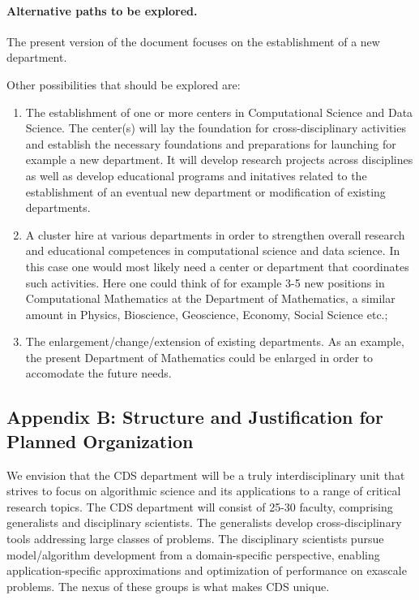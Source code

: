 \documentclass[%
oneside,                 %
final,                   %
10pt]{article}
\begin{document}
\noindent
\paragraph{Alternative paths to be explored.}
The present version of the document focuses on the establishment of a new department. 

Other possibilities that should be explored are: 
\begin{enumerate}
\item The establishment of one or more centers in Computational Science and Data Science. The center(s) will lay the foundation for cross-disciplinary activities and establish the necessary foundations and preparations for launching for example a new department. It will develop research projects across disciplines as well as develop educational programs and initatives related to the establishment of an eventual new department or modification of existing departments.

\item A cluster hire at various departments in order to strengthen overall research and educational competences in computational science and data science. In this case one would most likely need a center or department  that coordinates such activities. Here one could think of for example 3-5 new positions in Computational Mathematics at the Department of Mathematics, a similar amount in Physics, Bioscience, Geoscience, Economy, Social Science etc.;

\item The enlargement/change/extension of existing departments. As an example, the present Department of Mathematics could be enlarged in order to accomodate the future needs. 
\end{enumerate}

\noindent
\subsection*{Appendix B: Structure and Justification for Planned Organization}

We envision that the CDS department  will be a truly interdisciplinary unit that strives to focus on algorithmic
science and its applications to a range of critical research topics. The CDS department will consist of 25-30
faculty, comprising generalists and disciplinary scientists. The generalists develop cross-disciplinary
tools addressing large classes of problems. The disciplinary scientists pursue
model/algorithm development from a domain-specific perspective, enabling application-specific
approximations and optimization of performance on exascale problems. The nexus of these
groups is what makes CDS unique.
\end{document}
